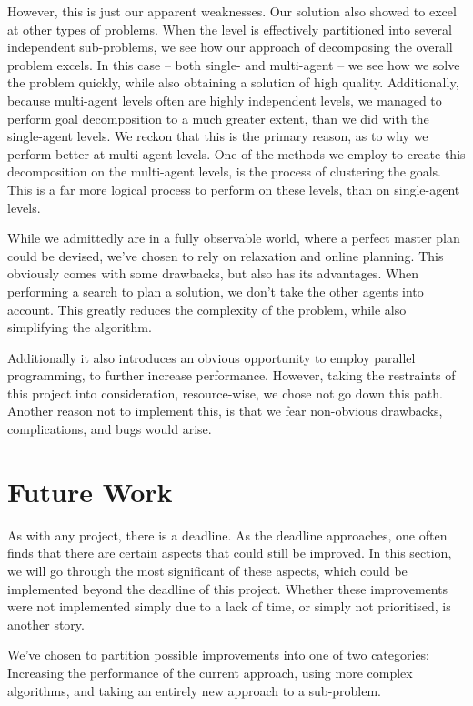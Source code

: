 \documentclass[letterpaper]{article}
\begin{document}
	However, this is just our apparent weaknesses. Our solution also showed to excel at other types of problems. When the level is effectively partitioned into several independent sub-problems, we see how our approach of decomposing the overall problem excels. In this case -- both single- and multi-agent -- we see how we solve the problem quickly, while also obtaining a solution of high quality. Additionally, because multi-agent levels often are highly independent levels, we managed to perform goal decomposition to a much greater extent, than we did with the single-agent levels. We reckon that this is the primary reason, as to why we perform better at multi-agent levels. One of the methods we employ to create this decomposition on the multi-agent levels, is the process of clustering the goals. This is a far more logical process to perform on these levels, than on single-agent levels.

	While we admittedly are in a fully observable world, where a perfect master plan could be devised, we've chosen to rely on relaxation and online planning. This obviously comes with some drawbacks, but also has its advantages. When performing a search to plan a solution, we don't take the other agents into account. This greatly reduces the complexity of the problem, while also simplifying the algorithm. 

	Additionally it also introduces an obvious opportunity to employ parallel programming, to further increase performance. However, taking the restraints of this project into consideration, resource-wise, we chose not go down this path. Another reason not to implement this, is that we fear non-obvious drawbacks, complications, and bugs would arise.
	
\section{Future Work}
	As with any project, there is a deadline. As the deadline approaches, one often finds that there are certain aspects that could still be improved. In this section, we will go through the most significant of these aspects, which could be implemented beyond the deadline of this project. Whether these improvements were not implemented simply due to a lack of time, or simply not prioritised, is another story. 

	We've chosen to partition possible improvements into one of two categories: Increasing the performance of the current approach, using more complex algorithms, and taking an entirely new approach to a sub-problem.
	
\end{document}
